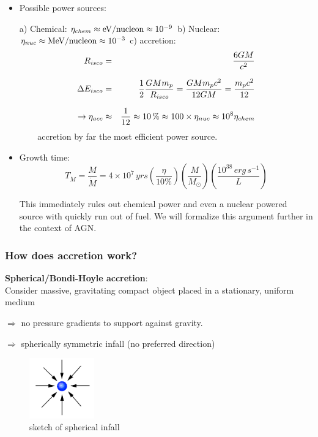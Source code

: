 \begin{itemize}
\item Possible power sources:

\subitem a) Chemical: $\eta_{chem} \approx \rm eV/nucleon \approx 10^{-9}$
\subitem b) Nuclear: $\eta_{nuc} \approx \rm MeV/nucleon \approx 10^{-3}$
\subitem c) accretion:
\begin{eqnarray}
 R_{isco} &=& \frac{6GM}{c^{2}} \nonumnext
 \Delta{E_{isco}} &=& \frac{1}{2} \frac{GM m_{p}}{R_{isco}}=\frac{GM m_{p} c^{2}}{12 GM} = \frac{m_{p}c^{2}}{12} \nonumnext
 \rightarrow \eta_{acc} &\approx& \frac{1}{12} \approx 10\,\% \approx 100\times \eta_{nuc} \approx 10^{8} \eta_{chem} \nonumber
\end{eqnarray}
$~~~~~~~~$ accretion by far the most efficient power source.

\item Growth time: 
\begin{equation}
   T_{\dot{M}} = \frac{M}{\dot{M}} = 4 \times 10^{7}\, yrs \left(\frac{\eta}{10\%}\right) \left(\frac{M}{M_{\odot}}\right) \left(\frac{10^{38}\,erg\,s^{-1}}{L} \right)
\end{equation}

This immediately rules out chemical power and even a nuclear powered source with quickly run
out of fuel. We will formalize this argument further in the context of AGN.  

\end{itemize}

\subsubsection{How does accretion work?}

\textbf{Spherical/Bondi-Hoyle accretion}:  \\
Consider massive, gravitating compact object placed in a stationary, uniform medium 

$\Rightarrow$ no pressure gradients to support against gravity.

$\Rightarrow$ spherically symmetric infall (no preferred direction)

\begin{figure}[!htbp]
   \centering
   \includegraphics[width=0.25\textwidth]{HighEnergy/infall}
   \caption{sketch of spherical infall}
\label{fig:infall}
\end{figure}

